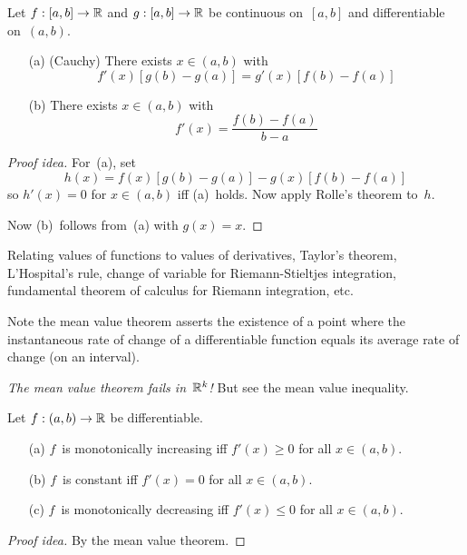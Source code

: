 \begin{thm}
Let \(f:[a,b]\to\mathbb{R}\) and \(g:[a,b]\to\mathbb{R}\) be continuous on~\([a,b]\) and differentiable on~\((a,b)\).
\begin{enumerate}[itemsep=0pt]
\item[(a)] (Cauchy) There exists \(x\in(a,b)\) with
\[f'(x)[g(b)-g(a)]=g'(x)[f(b)-f(a)]\]
\item[(b)] There exists \(x\in(a,b)\) with
\[f'(x)=\frac{f(b)-f(a)}{b-a}\]
\end{enumerate}
\end{thm}
\begin{proof}[Proof idea]
For~(a), set
\[h(x)=f(x)[g(b)-g(a)]-g(x)[f(b)-f(a)]\]
so \(h'(x)=0\) for \(x\in(a,b)\) iff (a)~holds. Now apply Rolle's theorem to~\(h\).

Now (b)~follows from~(a) with \(g(x)=x\).
\end{proof}
\begin{app}
Relating values of functions to values of derivatives, Taylor's theorem, L'Hospital's rule, change of variable for Riemann-Stieltjes integration, fundamental theorem of calculus for Riemann integration, etc.
\end{app}
\begin{rmk}
Note the mean value theorem asserts the existence of a point where the instantaneous rate of change of a differentiable function equals its average rate of change (on an interval).
\end{rmk}
\begin{rmk}
\emph{The mean value theorem fails in~\(\mathbb{R}^k\)!} But see the mean value inequality.
\end{rmk}

\begin{cor}[Monotonicity in~\(\R\)]
Let \(f:(a,b)\to\mathbb{R}\) be differentiable.
\begin{enumerate}[itemsep=0pt]
\item[(a)] \(f\)~is monotonically increasing iff \(f'(x)\ge0\) for all \(x\in(a,b)\).
\item[(b)] \(f\)~is constant iff \(f'(x)=0\) for all \(x\in(a,b)\).
\item[(c)] \(f\)~is monotonically decreasing iff \(f'(x)\le0\) for all \(x\in(a,b)\).
\end{enumerate}
\end{cor}
\begin{proof}[Proof idea]
By the mean value theorem.
\end{proof}

